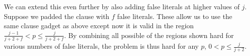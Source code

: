 \documentclass[11pt,letterpaper]{article}
\begin{document}
We can extend this even further by also adding false literals at higher values of $j$. Suppose we padded the clause with $f$ false literals. These allow us to use the same clause gadget as above except now it is valid in the region  $\frac{j-1}{j+2+f} < p \le \frac{j}{j+2+f}$. By combining all possible of the regions shown hard for various numbers of false literals, the problem is thus hard for any $p$, $0< p \le \frac{j}{j+2}$.






\end{document}
